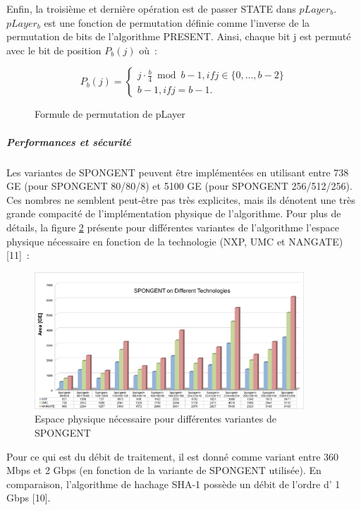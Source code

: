 		Enfin, la troisième et dernière opération est de passer STATE dans $pLayer_{b}$.
		$pLayer_{b}$ est une fonction de permutation définie comme l’inverse de la permutation de bits de l’algorithme PRESENT.
		Ainsi, chaque bit j est permuté avec le bit de position $P_{b}(j)$ où :

		\begin{figure}[!htbp]
			\centering
		\begin{equation}
			P_{b}(j) = \begin{cases}
			  j \cdot \frac{b}{4} \bmod b - 1, if j \in \{0, \dots, b - 2\}\\
			  b - 1, if j = b - 1.
			\end{cases}
		  \end{equation}
		  \caption{Formule de permutation de pLayer}
			\label{pLayer}
		\end{figure}

		\subparagraph{Performances et sécurité}

		Les variantes de SPONGENT peuvent être implémentées en utilisant entre 738 GE (pour SPONGENT 80/80/8) et 5100 GE (pour SPONGENT 256/512/256).
		Ces nombres ne semblent peut-être pas très explicites, mais ils dénotent une très grande compacité de l’implémentation physique de l’algorithme.
		Pour plus de détails, la figure \ref{espacePhysique} présente pour différentes variantes de l’algorithme l’espace physique nécessaire en fonction de la technologie (NXP, UMC et NANGATE)[11] :

		\begin{figure}[h]
			\centering
			\includegraphics[width=0.9\textwidth]{imgs/Spongent/espacePhysiqueVariante.png}
			\caption{Espace physique nécessaire pour différentes variantes de SPONGENT}
			\label{espacePhysique}
		\end{figure}

		Pour ce qui est du débit de traitement, il est donné comme variant entre 360 Mbps et 2 Gbps (en fonction de la variante de SPONGENT utilisée).
		En comparaison, l’algorithme de hachage SHA-1 possède un débit de l’ordre d’ 1 Gbps [10].

